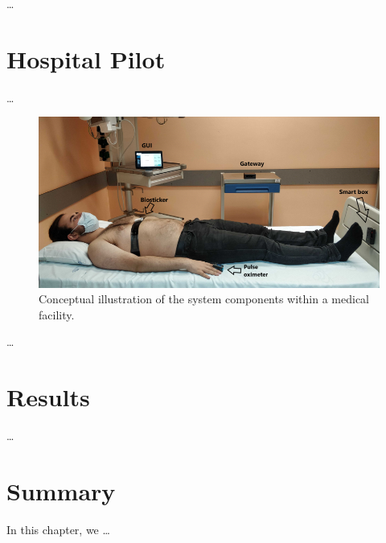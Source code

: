 \dots

\section{Hospital Pilot}
\dots


\begin{figure}[H]
    \centering
    \includegraphics[width=\linewidth]{images/hospital-trial.png}
    \caption[Conceptual illustration of the system components within a medical facility.]{Conceptual illustration of the system components within a medical facility.}
    \label{fig:hospital-trial}
\end{figure}
\dots

\section{Results}
\dots

\section{Summary}
In this chapter, we \dots
